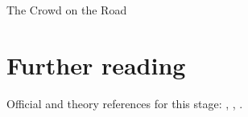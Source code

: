 \begin{ledger}{The Crowd on the Road}
\end{ledger}

\section{Further reading}
\label{sec:crowd_on_the_road:further_reading}
Official and theory references for this stage: \cite{CMS:2020ebo}, \cite{Cacciari:2007fd}, \cite{Cacciari:2008gn}.

\begin{pitfalls}
\end{pitfalls}

\begin{exercises}
\item {}
\item {}
\end{exercises}
